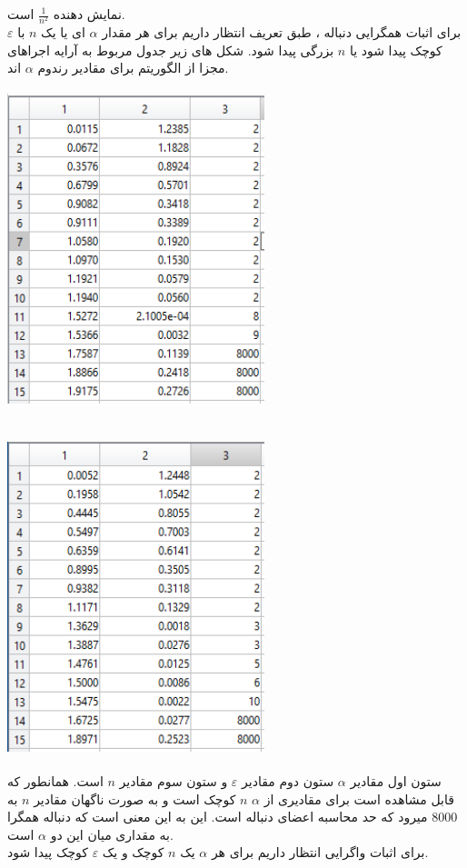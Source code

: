 \documentclass[12pt, letterpaper]{article}
\begin{document}
نمایش دهنده
 $\frac{1}{n^2}$ 
است. 
\\
برای اثبات همگرایی دنباله ، طبق تعریف انتظار داریم برای هر مقدار 
$\alpha$ 
ای یا یک $n$ 
با $\varepsilon$
 کوچک پیدا شود یا
 $n$ 
بزرگی پیدا شود. شکل های زیر جدول مربوط به آرایه اجراهای مجزا از الگوریتم برای مقادیر رندوم 
$\alpha$
 اند.
\\
\includegraphics[height=10cm, width=75mm]{figure3.png}
\includegraphics[height=10cm, width=75mm]{figure4.png}
\vspace{10mm}
\\
ستون اول مقادیر 
$\alpha$ 
ستون دوم مقادیر 
$\varepsilon$ 
و ستون سوم مقادیر 
$n$ 
است. همانطور که قابل مشاهده است برای مقادیری از 
$\alpha$ $n$ 
کوچک است و به صورت ناگهان مقادیر 
$n$
 به
 $8000$ 
میرود که حد محاسبه اعضای دنباله است. این به این معنی است که دنباله همگرا به مقداری میان این دو 
$\alpha$
 است.
\\
برای اثبات واگرایی انتظار داریم برای هر 
$\alpha$
یک 
$n$
کوچک و یک 
$\varepsilon$
 کوچک پیدا شود.
\end{document}
